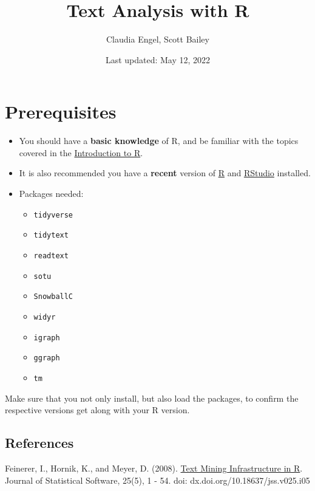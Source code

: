 \documentclass[
]{book}
\title{Text Analysis with R}
\author{Claudia Engel, Scott Bailey}
\date{Last updated: May 12, 2022}
\providecommand{\tightlist}{%
  \setlength{\itemsep}{0pt}\setlength{\parskip}{0pt}}
\begin{document}
\maketitle

{
\setcounter{tocdepth}{1}
\tableofcontents
}
\hypertarget{prerequisites}{%
\chapter*{Prerequisites}\label{prerequisites}}

\begin{itemize}
\item
  You should have a \textbf{basic knowledge} of R, and be familiar with the topics covered in the \href{https://cengel.github.io/R-intro/}{Introduction to R}.
\item
  It is also recommended you have a \textbf{recent} version of \href{https://cran.r-project.org/}{R} and \href{https://www.rstudio.com/}{RStudio} installed.
\item
  Packages needed:

  \begin{itemize}
  \tightlist
  \item
    \texttt{tidyverse}
  \item
    \texttt{tidytext}
  \item
    \texttt{readtext}
  \item
    \texttt{sotu}
  \item
    \texttt{SnowballC}
  \item
    \texttt{widyr}
  \item
    \texttt{igraph}
  \item
    \texttt{ggraph}
  \item
    \texttt{tm}
  \end{itemize}
\end{itemize}

Make sure that you not only install, but also load the packages, to confirm the respective versions get along with your R version.

\hypertarget{references}{%
\section*{References}\label{references}}

Feinerer, I., Hornik, K., and Meyer, D. (2008). \href{http://dx.doi.org/10.18637/jss.v025.i05}{Text Mining Infrastructure in R}. Journal of Statistical Software, 25(5), 1 - 54. doi: dx.doi.org/10.18637/jss.v025.i05
\end{document}

